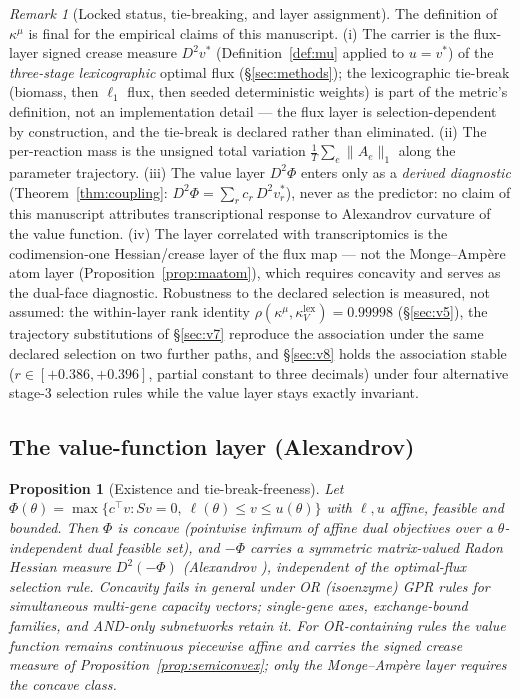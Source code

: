 \documentclass[11pt,a4paper]{article}
\theoremstyle{plain}
\newtheorem{proposition}[theorem]{Proposition}
\theoremstyle{definition}
\theoremstyle{remark}
\newtheorem{remark}[theorem]{Remark}
\newcommand{\kk}{\kappa_{\!V}}
\newcommand{\kmu}{\kappa^{\mu}}
\begin{document}
\begin{remark}[Locked status, tie-breaking, and layer assignment]
\label{rem:lock}
The definition of $\kmu$ is final for the empirical claims of this
manuscript. (i) The carrier is the flux-layer signed crease measure
$D^2 v^*$ (Definition~\ref{def:mu} applied to $u = v^*$) of the
\emph{three-stage lexicographic} optimal flux (\S\ref{sec:methods});
the lexicographic tie-break (biomass, then $\ell_1$ flux, then seeded
deterministic weights) is part of the metric's definition, not an
implementation detail --- the flux layer is selection-dependent by
construction, and the tie-break is declared rather than eliminated.
(ii) The per-reaction mass is the unsigned total variation
$\frac{1}{T}\sum_e \|A_e\|_1$ along the parameter trajectory.
(iii) The value layer $D^2\Phi$ enters only as a \emph{derived
diagnostic} (Theorem~\ref{thm:coupling}:
$D^2\Phi = \sum_r c_r\, D^2 v^*_r$), never as the predictor: no claim
of this manuscript attributes transcriptional response to Alexandrov
curvature of the value function. (iv) The layer correlated with
transcriptomics is the codimension-one Hessian/crease layer of the
flux map --- not the Monge--Amp\`ere atom layer
(Proposition~\ref{prop:maatom}), which requires concavity and serves
as the dual-face diagnostic. Robustness to the declared selection is
measured, not assumed: the within-layer rank identity
$\rho(\kmu, \kk^{\mathrm{lex}}) = 0.99998$ (\S\ref{sec:v5}), the trajectory substitutions of \S\ref{sec:v7} reproduce the association under the same declared selection on two further paths, and \S\ref{sec:v8} holds the
association stable ($r \in [+0.386, +0.396]$, partial constant to
three decimals) under four alternative stage-3 selection rules while
the value layer stays exactly invariant.
\end{remark}

\subsection{The value-function layer (Alexandrov)}

\begin{proposition}[Existence and tie-break-freeness]\label{prop:alex}
Let $\Phi(\theta) = \max\{ c^\top v : Sv = 0,\ \ell(\theta) \le v \le
u(\theta)\}$ with $\ell, u$ affine, feasible and bounded. Then $\Phi$ is
concave (pointwise infimum of affine dual objectives over a
$\theta$-independent dual feasible set), and $-\Phi$ carries a symmetric
matrix-valued Radon Hessian measure $D^2(-\Phi)$ (Alexandrov
\citep{alexandrov1939}), independent
of the optimal-flux selection rule. Concavity fails in general under OR
(isoenzyme) GPR rules for simultaneous multi-gene capacity vectors;
single-gene axes, exchange-bound families, and AND-only subnetworks
retain it. For OR-containing rules the value function remains
continuous piecewise affine and carries the signed crease measure of
Proposition~\ref{prop:semiconvex}; only the Monge--Amp\`ere layer
requires the concave class.
\end{proposition}
\end{document}
